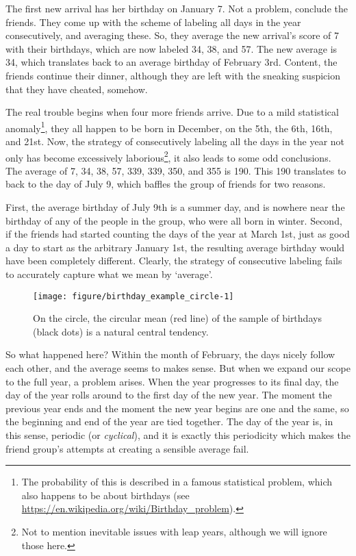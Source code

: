 \documentclass[12pt, a4paper]{book}\usepackage[]{graphicx}\usepackage[]{color}
\makeatletter
\def\maxwidth{ %
  \ifdim\Gin@nat@width>\linewidth
    \linewidth
  \else
    \Gin@nat@width
  \fi
}
\newenvironment{knitrout}{}{} %
\makeatother
\begin{document}
The first new arrival has her birthday on January 7. Not a problem, conclude the friends. They come up with the scheme of labeling all days in the year consecutively, and averaging these. So, they average the new arrival's score of 7 with their birthdays, which are now labeled 34, 38, and 57. The new average is 34, which translates back to an average birthday of February 3rd. Content, the friends continue their dinner, although they are left with the sneaking suspicion that they have cheated, somehow.




The real trouble begins when four more friends arrive. Due to a mild statistical anomaly\footnote{The probability of this is described in a famous statistical problem, which also happens to be about birthdays (see \url{https://en.wikipedia.org/wiki/Birthday_problem}).}, they all happen to be born in December, on the 5th, the 6th,  16th, and 21st. Now, the strategy of consecutively labeling all the days in the year not only has become excessively laborious\footnote{Not to mention inevitable issues with leap years, although we will ignore those here.}, it also leads to some odd conclusions. The average of 7, 34, 38, 57, 339, 339, 350, and 355 is 190. This 190 translates to back to the day of July 9, which baffles the group of friends for two reasons.

First, the average birthday of July 9th is a summer day, and is nowhere near the birthday of any of the people in the group, who were all born in winter. Second, if the friends had started counting the days of the year at March 1st, just as good a day to start as the arbitrary January 1st, the resulting average birthday would have been completely different. Clearly, the strategy of consecutive labeling fails to accurately capture what we mean by `average'.

\begin{figure}
\begin{knitrout}
\color{fgcolor}
\texttt{[image: figure/birthday\_example\_circle-1]} 

\end{knitrout}
\caption{On the circle, the circular mean (red line) of the sample of birthdays (black dots)  is a natural central tendency.}
\label{birthday_example_circle}
\end{figure}



So what happened here? Within the month of February, the days nicely follow each other, and the average seems to makes sense. But when we expand our scope to the full year, a problem arises. When the year progresses to its final day, the day of the year rolls around to the first day of the new year. The moment the previous year ends and the moment the new year begins are one and the same, so the beginning and end of the year are tied together. The day of the year is, in this sense, periodic (or \textit{cyclical}), and it is exactly this periodicity which makes the friend group's attempts at creating a sensible average fail.
\end{document}

